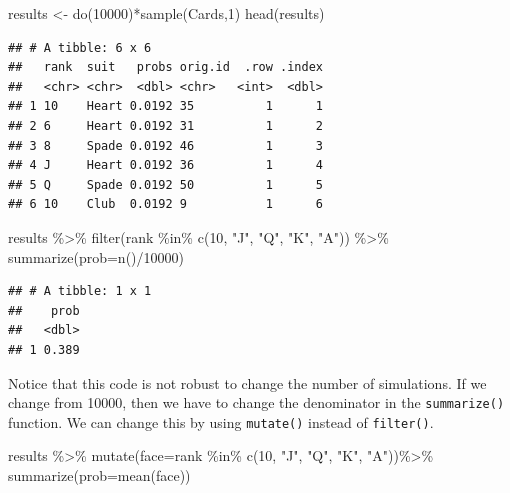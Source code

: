 \documentclass[
]{book}
\newenvironment{Shaded}{\begin{snugshade}}{\end{snugshade}}
\newcommand{\AttributeTok}[1]{\textcolor[rgb]{0.77,0.63,0.00}{#1}}
\newcommand{\DecValTok}[1]{\textcolor[rgb]{0.00,0.00,0.81}{#1}}
\newcommand{\FunctionTok}[1]{\textcolor[rgb]{0.00,0.00,0.00}{#1}}
\newcommand{\NormalTok}[1]{#1}
\newcommand{\OtherTok}[1]{\textcolor[rgb]{0.56,0.35,0.01}{#1}}
\newcommand{\SpecialCharTok}[1]{\textcolor[rgb]{0.00,0.00,0.00}{#1}}
\newcommand{\StringTok}[1]{\textcolor[rgb]{0.31,0.60,0.02}{#1}}
\begin{document}
\begin{Shaded}
\begin{Highlighting}[]
\NormalTok{results }\OtherTok{\textless{}{-}} \FunctionTok{do}\NormalTok{(}\DecValTok{10000}\NormalTok{)}\SpecialCharTok{*}\FunctionTok{sample}\NormalTok{(Cards,}\DecValTok{1}\NormalTok{)}
\FunctionTok{head}\NormalTok{(results)}
\end{Highlighting}
\end{Shaded}

\begin{verbatim}
## # A tibble: 6 x 6
##   rank  suit   probs orig.id  .row .index
##   <chr> <chr>  <dbl> <chr>   <int>  <dbl>
## 1 10    Heart 0.0192 35          1      1
## 2 6     Heart 0.0192 31          1      2
## 3 8     Spade 0.0192 46          1      3
## 4 J     Heart 0.0192 36          1      4
## 5 Q     Spade 0.0192 50          1      5
## 6 10    Club  0.0192 9           1      6
\end{verbatim}

\begin{Shaded}
\begin{Highlighting}[]
\NormalTok{results }\SpecialCharTok{\%\textgreater{}\%}
  \FunctionTok{filter}\NormalTok{(rank }\SpecialCharTok{\%in\%} \FunctionTok{c}\NormalTok{(}\DecValTok{10}\NormalTok{, }\StringTok{"J"}\NormalTok{, }\StringTok{"Q"}\NormalTok{, }\StringTok{"K"}\NormalTok{, }\StringTok{"A"}\NormalTok{)) }\SpecialCharTok{\%\textgreater{}\%}
  \FunctionTok{summarize}\NormalTok{(}\AttributeTok{prob=}\FunctionTok{n}\NormalTok{()}\SpecialCharTok{/}\DecValTok{10000}\NormalTok{)}
\end{Highlighting}
\end{Shaded}

\begin{verbatim}
## # A tibble: 1 x 1
##    prob
##   <dbl>
## 1 0.389
\end{verbatim}

Notice that this code is not robust to change the number of simulations. If we change from 10000, then we have to change the denominator in the \texttt{summarize()} function. We can change this by using \texttt{mutate()} instead of \texttt{filter()}.

\begin{Shaded}
\begin{Highlighting}[]
\NormalTok{results }\SpecialCharTok{\%\textgreater{}\%}
  \FunctionTok{mutate}\NormalTok{(}\AttributeTok{face=}\NormalTok{rank }\SpecialCharTok{\%in\%} \FunctionTok{c}\NormalTok{(}\DecValTok{10}\NormalTok{, }\StringTok{"J"}\NormalTok{, }\StringTok{"Q"}\NormalTok{, }\StringTok{"K"}\NormalTok{, }\StringTok{"A"}\NormalTok{))}\SpecialCharTok{\%\textgreater{}\%}
  \FunctionTok{summarize}\NormalTok{(}\AttributeTok{prob=}\FunctionTok{mean}\NormalTok{(face))}
\end{Highlighting}
\end{Shaded}
\end{document}
